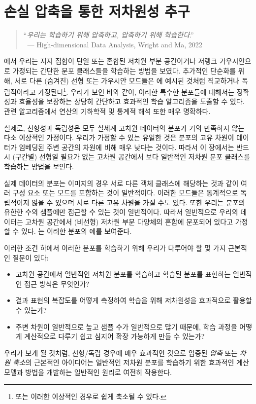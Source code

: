 \documentclass[../../book-main_ko.tex]{subfiles}
\begin{document}
\chapter{손실 압축을 통한 저차원성 추구}
\label{ch:compression}\label{ch:general-distribution}

\begin{quote}
	\hfill    ``{\em 우리는 학습하기 위해 압축하고, 압축하기 위해 학습한다}.''\\
	$~$ \hfill --- High-dimensional Data Analysis, Wright and Ma, 2022
\end{quote}
\vspace{5mm}

에서 우리는 지지 집합이 단일 또는 혼합된 저차원 부분 공간이거나 저랭크 가우시안으로 가정되는 간단한 분포 클래스들을 학습하는 방법을 보였다. 추가적인 단순화를 위해, 서로 다른 (숨겨진) 선형 또는 가우시안 모드들은 에 예시된 것처럼 직교하거나 독립적이라고 가정된다\footnote{또는 이러한 이상적인 경우로 쉽게 축소될 수 있다.}. 우리가 보인 바와 같이, 이러한 특수한 분포들에 대해서는 정확성과 효율성을 보장하는 상당히 간단하고 효과적인 학습 알고리즘을 도출할 수 있다. 관련 알고리즘에서 연산의 기하학적 및 통계적 해석 또한 매우 명확하다.

실제로, 선형성과 독립성은 모두 실세계 고차원 데이터의 분포가 거의 만족하지 않는 다소 이상적인 가정이다. 우리가 가정할 수 있는 유일한 것은 분포의 고유 차원이 데이터가 임베딩된 주변 공간의 차원에 비해 매우 낮다는 것이다. 따라서 이 장에서는 반드시 (구간별) 선형일 필요가 없는 고차원 공간에서 보다 일반적인 저차원 분포 클래스를 학습하는 방법을 보인다.

실제 데이터의 분포는 이미지의 경우 서로 다른 객체 클래스에 해당하는 것과 같이 여러 구성 요소 또는 모드를 포함하는 것이 일반적이다. 이러한 모드들은 통계적으로 독립적이지 않을 수 있으며 서로 다른 고유 차원을 가질 수도 있다. 또한 우리는 분포의 유한한 수의 샘플에만 접근할 수 있는 것이 일반적이다. 따라서 일반적으로 우리의 데이터는 고차원 공간에서 (비선형) 저차원 부분 다양체의 혼합에 분포되어 있다고 가정할 수 있다. 는 이러한 분포의 예를 보여준다.

이러한 조건 하에서 이러한 분포를 학습하기 위해 우리가 다루어야 할 몇 가지 근본적인 질문이 있다:
\begin{itemize}
	\item 고차원 공간에서 일반적인 저차원 분포를 학습하고 학습된 분포를 표현하는 일반적인 접근 방식은 무엇인가?
	\item 결과 표현의 복잡도를 어떻게 측정하여 학습을 위해 저차원성을 효과적으로 활용할 수 있는가?
	\item 주변 차원이 일반적으로 높고 샘플 수가 일반적으로 많기 때문에, 학습 과정을 어떻게 계산적으로 다루기 쉽고 심지어 확장 가능하게 만들 수 있는가?
\end{itemize}
우리가 보게 될 것처럼, 선형/독립 경우에 매우 효과적인 것으로 입증된 {\em 압축} 또는 {\em 차원 축소}의 근본적인 아이디어는 일반적인 저차원 분포를 학습하기 위한 효과적인 계산 모델과 방법을 개발하는 일반적인 원리로 여전히 작용한다.
\end{document}
